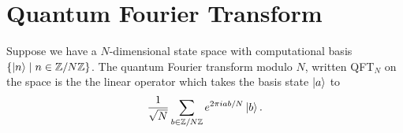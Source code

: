 \documentclass[a4paper]{amsart}
\begin{document}
\section{Quantum Fourier Transform}

\begin{definition}
  Suppose we have a $N$-dimensional state space with computational basis $\{\ket{n} \mid n \in \mathbb{Z}/N\mathbb{Z}\}$. The quantum Fourier transform modulo $N$, written QFT$_N$ on the space is the the linear operator which takes the basis state $\ket{a}$ to
  $$
\frac{1}{\sqrt{N}} \sum_{b \in \mathbb{Z}/N\mathbb{Z}} e^{2 \pi i a b/N} \ket{b}.
  $$
\end{definition}


\end{document}
